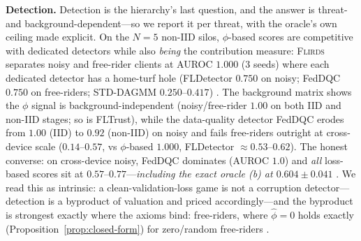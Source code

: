 \textbf{Detection.} Detection is the hierarchy's last question, and the answer
is threat- and background-dependent---so we report it per threat, with the
oracle's own ceiling made explicit. On the $N{=}5$ non-IID silos, $\phi$-based
scores are competitive with dedicated detectors while also \emph{being} the
contribution measure: \textsc{Flirds} separates noisy and free-rider clients
at AUROC $1.000$ (3 seeds) where each dedicated detector has a home-turf hole
(FLDetector $0.750$ on noisy; FedDQC $0.750$ on free-riders; STD-DAGMM
$0.250$--$0.417$) . The background matrix shows
the $\phi$ signal is background-independent (noisy/free-rider $1.00$ on both
IID and non-IID stages; so is FLTrust), while the data-quality detector FedDQC
erodes from $1.00$ (IID) to $0.92$ (non-IID) on noisy and fails free-riders
outright at cross-device scale ($0.14$--$0.57$, vs $\phi$-based $1.000$,
FLDetector $\approx 0.53$--$0.62$). The honest converse: on cross-device noisy,
FedDQC dominates (AUROC $1.0$) and \emph{all} loss-based scores sit at
$0.57$--$0.77$---\emph{including the exact oracle (b) at
$0.604 \pm 0.041$} . We read this as intrinsic: a clean-validation-loss game is not a
corruption detector---detection is a byproduct of valuation and priced
accordingly---and the byproduct is strongest exactly where the axioms bind:
free-riders, where $\hat\phi = 0$ holds exactly
(Proposition~\ref{prop:closed-form}) for zero/random free-riders .
